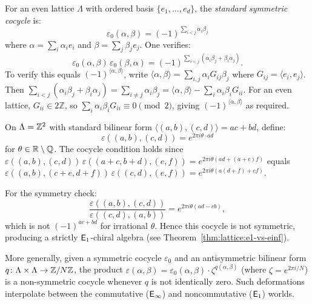 \begin{construction}\label{constr:lattice:standard-cocycle}
For an even lattice $\Lambda$ with ordered basis $\{e_1, \ldots, e_d\}$,
the \emph{standard symmetric cocycle} is:
\begin{equation}\label{eq:lattice:standard-cocycle}
\varepsilon_0(\alpha, \beta)
= (-1)^{\sum_{i < j} \alpha_i \beta_j}
\end{equation}
where $\alpha = \sum_i \alpha_i e_i$ and $\beta = \sum_j \beta_j e_j$.
One verifies:
\[
\varepsilon_0(\alpha,\beta)\,\varepsilon_0(\beta,\alpha)
= (-1)^{\sum_{i<j}(\alpha_i\beta_j + \beta_i\alpha_j)}.
\]
To verify this equals $(-1)^{\langle\alpha,\beta\rangle}$, write $\langle\alpha,\beta\rangle = \sum_{i,j} \alpha_i G_{ij}\beta_j$ where $G_{ij} = \langle e_i, e_j\rangle$.  Then $\sum_{i<j}(\alpha_i\beta_j + \beta_i\alpha_j) = \sum_{i \neq j}\alpha_i\beta_j = \langle\alpha,\beta\rangle - \sum_i \alpha_i\beta_i G_{ii}$.  For an even lattice, $G_{ii} \in 2\mathbb{Z}$, so $\sum_i \alpha_i\beta_i G_{ii} \equiv 0 \pmod{2}$, giving $(-1)^{\langle\alpha,\beta\rangle}$ as required.
\end{construction}

\begin{example}\label{ex:lattice:nonsym-z2}
On $\Lambda = \mathbb{Z}^2$ with standard bilinear form
$\langle (a,b), (c,d) \rangle = ac + bd$, define:
\[
\varepsilon((a,b), (c,d)) = e^{2\pi i \theta \cdot ad}
\]
for $\theta \in \mathbb{R} \setminus \mathbb{Q}$.
The cocycle condition holds since
$\varepsilon((a,b),(c,d))\,\varepsilon((a+c,b+d),(e,f))
= e^{2\pi i\theta(ad + (a+c)f)}$
equals
$\varepsilon((a,b),(c+e,d+f))\,\varepsilon((c,d),(e,f))
= e^{2\pi i\theta(a(d+f) + cf)}$.

For the symmetry check:
\[
\frac{\varepsilon((a,b),(c,d))}{\varepsilon((c,d),(a,b))}
= e^{2\pi i\theta(ad - cb)},
\]
which is not $(-1)^{ac+bd}$ for irrational $\theta$. Hence this cocycle
is not symmetric, producing a strictly $\mathsf{E}_1$-chiral algebra
(see Theorem~\ref{thm:lattice:e1-vs-einf}).
\end{example}

\begin{remark}
\label{rem:lattice:root-of-unity-deformation}
More generally, given a symmetric cocycle $\varepsilon_0$ and an
antisymmetric bilinear form $q \colon \Lambda \times \Lambda \to \mathbb{Z}/N\mathbb{Z}$,
the product
$\varepsilon(\alpha, \beta) = \varepsilon_0(\alpha, \beta) \cdot
\zeta^{q(\alpha,\beta)}$
(where $\zeta = e^{2\pi i/N}$) is a non-symmetric cocycle whenever $q$
is not identically zero. Such deformations interpolate between the
commutative ($\mathsf{E}_{\infty}$) and noncommutative ($\mathsf{E}_1$) worlds.
\end{remark}



